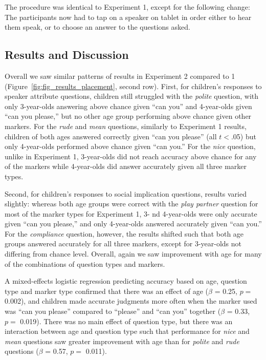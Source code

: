 \documentclass[10pt, letterpaper]{article}
\begin{document}
The procedure was identical to Experiment 1, except for the following
change: The participants now had to tap on a speaker on tablet in order
either to hear them speak, or to choose an answer to the questions
asked.

\subsection{Results and Discussion}\label{results-and-discussion-1}

Overall we saw similar patterns of results in Experiment 2 compared to 1
(Figure~\ref{fig:fig_results_placement}, second row). First, for
children's responses to speaker attribute questions, children still
struggled with the \emph{polite} question, with only 3-year-olds
answering above chance given ``can you'' and 4-year-olds given ``can you
please,'' but no other age group performing above chance given other
markers. For the \emph{rude} and \emph{mean} questions, similarly to
Experiment 1 results, children of both ages answered correctly given
``can you please'' (all \(t<\).05) but only 4-year-olds performed above
chance given ``can you.'' For the \emph{nice} question, unlike in
Experiment 1, 3-year-olds did not reach accuracy above chance for any of
the markers while 4-year-olds did answer accurately given all three
marker types.

Second, for children's responses to social implication questions,
results varied slightly: whereas both age groups were correct with the
\emph{play partner} question for most of the marker types for Experiment
1, 3- nd 4-year-olds were only accurate given ``can you please,'' and
only 4-year-olds answered accurately given ``can you.'' For the
\emph{compliance} question, however, the results shifted such that both
age groups answered accurately for all three markers, except for
3-year-olds not differing from chance level. Overall, again we saw
improvement with age for many of the combinations of question types and
markers.

A mixed-effects logistic regression predicting accuracy based on age,
question type and marker type confirmed that there was an effect of age
(\(\beta\) = 0.25, \(p =\) 0.002), and children made accurate judgments
more often when the marker used was ``can you please'' compared to
``please'' and ``can you'' together (\(\beta\) = 0.33, \(p =\) 0.019).
There was no main effect of question type, but there was an interaction
between age and question type such that performance for \emph{nice} and
\emph{mean} questions saw greater improvement with age than for
\emph{polite} and \emph{rude} questions (\(\beta\) = 0.57, \(p =\)
0.011).
\end{document}
